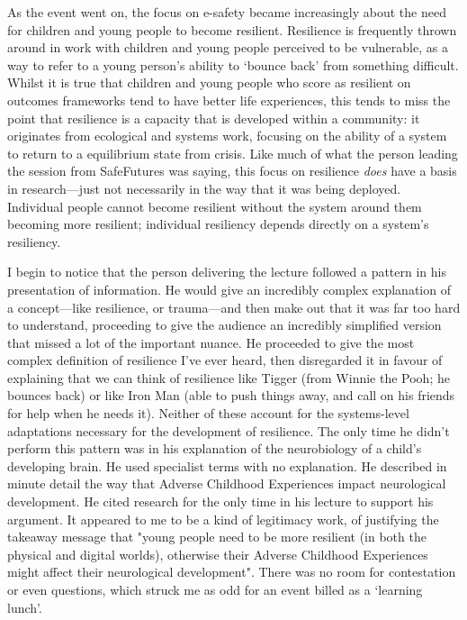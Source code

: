 As the event went on, the focus on e-safety became increasingly about the need for children and young people to become resilient. Resilience is frequently thrown around in work with children and young people perceived to be vulnerable, as a way to refer to a young person's ability to `bounce back' from something difficult. Whilst it is true that children and young people who score as resilient on outcomes frameworks tend to have better life experiences, this tends to miss the point that resilience is a capacity that is developed within a community: it originates from ecological and systems work, focusing on the ability of a system to return to a equilibrium state from crisis. Like much of what the person leading the session from SafeFutures was saying, this focus on resilience \textit{does} have a basis in research—just not necessarily in the way that it was being deployed. Individual people cannot become resilient without the system around them becoming more resilient; individual resiliency depends directly on a system's resiliency. 

I begin to notice that the person delivering the lecture followed a pattern in his presentation of information. He would give an incredibly complex explanation of a concept—like resilience, or trauma—and then make out that it was far too hard to understand, proceeding to give the audience an incredibly simplified version that missed a lot of the important nuance. He proceeded to give the most complex definition of resilience I've ever heard, then disregarded it in favour of explaining that we can think of resilience like Tigger (from Winnie the Pooh; he bounces back) or like Iron Man (able to push things away, and call on his friends for help when he needs it). Neither of these account for the systems-level adaptations necessary for the development of resilience. The only time he didn't perform this pattern was in his explanation of the neurobiology of a child's developing brain. He used specialist terms with no explanation. He described in minute detail the way that Adverse Childhood Experiences impact neurological development. He cited research for the only time in his lecture to support his argument. It appeared to me to be a kind of legitimacy work, of justifying the takeaway message that "young people need to be more resilient (in both the physical and digital worlds), otherwise their Adverse Childhood Experiences might affect their neurological development". There was no room for contestation or even questions, which struck me as odd for an event billed as a `learning lunch'.

